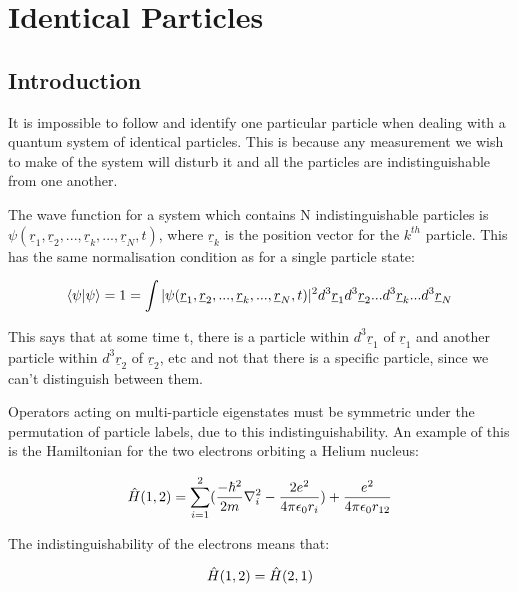 \chapter{Identical Particles}
\label{chapt5}


\section{Introduction}

It is impossible to follow and identify one particular particle when dealing with a quantum system of identical particles. This is because any measurement we wish to make of the system will disturb it and all the particles are indistinguishable from one another.

\noindent The wave function for a system which contains N indistinguishable particles is $\psi(\underline{r}_1, \underline{r}_2, ..., \underline{r}_k, ..., \underline{r}_N, t)$, where $\underline{r}_k$ is the position vector for the $k^{th}$ particle. This has the same normalisation condition as for a single particle state:

\begin{equation}
    \braket{\psi | \psi} = 1 = \int | \psi(\underline{r}_1, \underline{r}_2, ..., \underline{r}_k, ..., \underline{r}_N, t) |^2 d^3\underline{r}_1 d^3\underline{r}_2 ... d^3\underline{r}_k ... d^3\underline{r}_N
    \label{ManyParticleNormalisation}
\end{equation}

\noindent This says that at some time t, there is a particle within $d^3\underline{r}_1$ of $\underline{r}_1$ and another particle within $d^3\underline{r}_2$ of $\underline{r}_2$, etc and not that there is a specific particle, since we can't distinguish between them.

\noindent Operators acting on multi-particle eigenstates must be symmetric under the permutation of particle labels, due to this indistinguishability. An example of this is the Hamiltonian for the two electrons orbiting a Helium nucleus:

\begin{equation}
    \Hat{H}(1, 2) = \sum_{i=1}^2 (\frac{-\hbar^2}{2m}\nabla^2_i - \frac{2e^2}{4 \pi \epsilon_0 r_i}) + \frac{e^2}{4 \pi \epsilon_0 r_{12}}
    \label{HeliumAtomHamiltonian}
\end{equation}

\noindent The indistinguishability of the electrons means that:

\begin{equation}
    \Hat{H}(1, 2) = \Hat{H}(2, 1)
    \label{ExchangeDegeneracy}
\end{equation}

